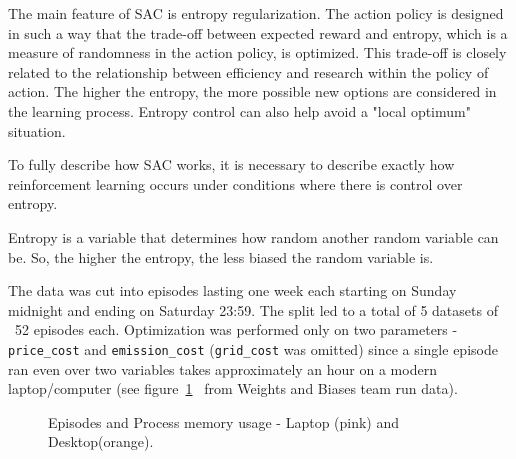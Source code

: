 \documentclass{article}
\numberwithin{equation}{subsection}
\begin{document}
The main feature of SAC is entropy regularization. The action policy is designed in such a way that the trade-off between expected reward and entropy, which is a measure of randomness in the action policy, is optimized. This trade-off is closely related to the relationship between efficiency and research within the policy of action. The higher the entropy, the more possible new options are considered in the learning process. Entropy control can also help avoid a "local optimum" situation.

To fully describe how SAC works, it is necessary to describe exactly how reinforcement learning occurs under conditions where there is control over entropy.

Entropy is a variable that determines how random another random variable can be. So, the higher the entropy, the less biased the random variable is.

The data was cut into episodes lasting one week each starting on Sunday midnight and ending on Saturday 23:59. The split led to a total of 5 datasets of ~52 episodes each. Optimization was performed only on two parameters - \verb!price_cost! and \verb!emission_cost! (\verb!grid_cost! was omitted) since a single episode ran even over two variables takes approximately an hour on a modern laptop/computer (see figure~\ref{fig:ep-mem-use}~ from Weights and Biases team run data\cite{wandb}). 

\begin{figure}[H]
	{\centering
	  \par}
	\caption{Episodes and Process memory usage - Laptop (pink) and Desktop(orange).}
	\label{fig:ep-mem-use}
\end{figure}
\end{document}
